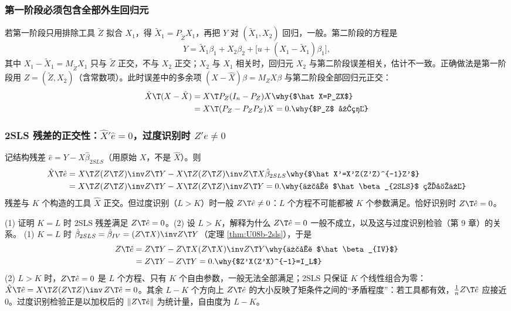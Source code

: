 \subsubsection{第一阶段必须包含全部外生回归元}

\begin{note}
若第一阶段只用排除工具 $\tilde Z$ 拟合 $X_1$，得 $\tilde X_1=P_{\tilde Z}X_1$，再把 $Y$ 对 $(\tilde X_1,X_2)$ 回归，一般。第二阶段的方程是
\[
Y=\tilde X_1\beta_1+X_2\beta_2+\big[u+(X_1-\tilde X_1)\beta_1\big],
\]
其中 $X_1-\tilde X_1=M_{\tilde Z}X_1$ 只与 $\tilde Z$ 正交，不与 $X_2$ 正交；$X_2$ 与 $X_1$ 相关时，回归元 $X_2$ 与第二阶段误差相关，估计不一致。正确做法是第一阶段用 $Z=(\tilde Z,X_2)$（含常数项）。此时误差中的多余项 $(X-\hat X)\beta=M_ZX\beta$ 与第二阶段全部回归元正交：
\begin{align*}
\hat X\T(X-\hat X)&=X\T P_Z(I_n-P_Z)X \why{$\hat X=P_ZX$}\\
&=X\T(P_Z-P_ZP_Z)X=0 . \why{$P_Z$ 幂等}
\end{align*}
\end{note}

\subsubsection{2SLS 残差的正交性：\texorpdfstring{$\hat X'\hat e=0$}{X-hat' e-hat = 0}，过度识别时 \texorpdfstring{$Z'\hat e\neq0$}{Z' e-hat != 0}}

记结构残差 $\hat e=Y-X\hat\beta_{2SLS}$（用原始 $X$，不是 $\hat X$）。则
\begin{align*}
\hat X\T\hat e&=X\T Z(Z\T Z)\inv Z\T Y-X\T Z(Z\T Z)\inv Z\T X\hat\beta_{2SLS} \why{$\hat X'=X'Z(Z'Z)^{-1}Z'$}\\
&=X\T Z(Z\T Z)\inv Z\T Y-X\T Z(Z\T Z)\inv Z\T Y=0 . \why{代入 $\hat\beta_{2SLS}$ 的定义}
\end{align*}
残差与 $K$ 个构造的工具 $\hat X$ 正交。但过度识别（$L>K$）时一般 $Z\T\hat e\neq0$：$L$ 个方程不可能都被 $K$ 个参数满足。恰好识别时 $Z\T\hat e=0$。

\begin{prac}\label{pr:U08b-resid}
(1) 证明 $K=L$ 时 2SLS 残差满足 $Z\T\hat e=0$。(2) 设 $L>K$，解释为什么 $Z\T\hat e=0$ 一般不成立，以及这与过度识别检验（第 9 章）的关系。
\answer
(1) $K=L$ 时 $\hat\beta_{2SLS}=\hat\beta_{IV}=(Z\T X)\inv Z\T Y$（定理 \ref{thm:U08b-2sls}），于是
\begin{align*}
Z\T\hat e&=Z\T Y-Z\T X(Z\T X)\inv Z\T Y \why{代入 $\hat\beta_{IV}$}\\
&=Z\T Y-Z\T Y=0 . \why{$Z'X(Z'X)^{-1}=I_L$}
\end{align*}
(2) $L>K$ 时，$Z\T\hat e=0$ 是 $L$ 个方程、只有 $K$ 个自由参数，一般无法全部满足；2SLS 只保证 $K$ 个线性组合为零：$\hat X\T\hat e=X\T Z(Z\T Z)\inv\,Z\T\hat e=0$。其余 $L-K$ 个方向上 $Z\T\hat e$ 的大小反映了矩条件之间的“矛盾程度”：若工具都有效，$\frac1nZ\T\hat e$ 应接近 $0$。过度识别检验正是以加权后的 $\|Z\T\hat e\|$ 为统计量，自由度为 $L-K$。
\end{prac}

